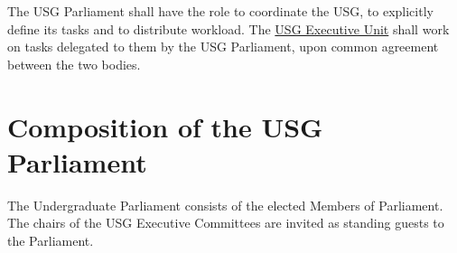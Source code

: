 \label{USGParliamentDef}
The USG Parliament shall have the role to coordinate the USG, to explicitly define its tasks and to distribute workload. The \hyperref[USGexecutiveUnitDef]{USG Executive Unit} shall work on tasks delegated to them by the USG Parliament, upon common agreement between the two bodies.

\section{Composition of the USG Parliament} 
\label{ParlamentComposition}
The Undergraduate Parliament consists of the elected Members of Parliament. The chairs of the USG Executive Committees are invited as standing guests to the Parliament.